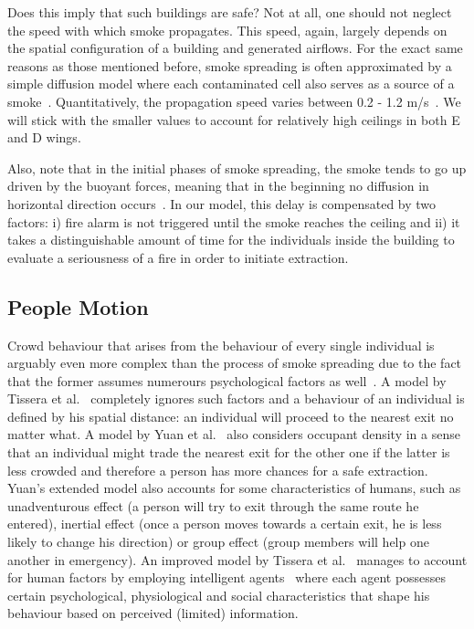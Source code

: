 Does this imply that such buildings are safe?
Not at all, one should not neglect the speed with which smoke propagates.
This speed, again, largely depends on the spatial configuration of a building
and generated airflows.
For the exact same reasons as those mentioned before, smoke spreading is often
approximated by a simple diffusion model where each contaminated cell also
serves as a source of a smoke~\cite{Tissera1, Tissera2}.
Quantitatively, the propagation speed varies between 0.2 - 1.2 m/s~\cite{Smoke}.
We will stick with the smaller values to account for relatively high ceilings in
both E and D wings.

Also, note that in the initial phases of smoke spreading, the smoke tends to go
up driven by the buoyant forces, meaning that in the beginning no diffusion
in horizontal direction occurs~\cite{Curiac}.
In our model, this delay is compensated by two factors: i) fire alarm is not
triggered until the smoke reaches the ceiling and ii) it takes a distinguishable
amount of time for the individuals inside the building to evaluate a
seriousness of a fire in order to initiate extraction.

\subsection{People Motion}
Crowd behaviour that arises from the behaviour of every single individual is
arguably even more complex than the process of smoke spreading due to the fact
that the former assumes numerours psychological factors as well~\cite{Ying}.
A model by Tissera et al.~\cite{Tissera1} completely ignores such factors and a
behaviour of an individual is defined by his spatial distance: an individual
will proceed to the nearest exit no matter what.
A model by Yuan et al.~\cite{Yuan} also considers occupant density in a sense
that an individual might trade the nearest exit for the other one if the latter
is less crowded and therefore a person has more chances for a safe extraction.
Yuan's extended model also accounts for some characteristics of humans,
such as unadventurous effect (a person will try to exit through the same route
he entered), inertial effect (once a person moves towards a
certain exit, he is less likely to change his direction) or group effect
(group members will help one another in emergency).
An improved model by Tissera et al.~\cite{Tissera2} manages to account for human
factors by employing intelligent agents~\cite{AI} where each agent possesses
certain psychological, physiological and social characteristics that shape his
behaviour based on perceived (limited) information.

